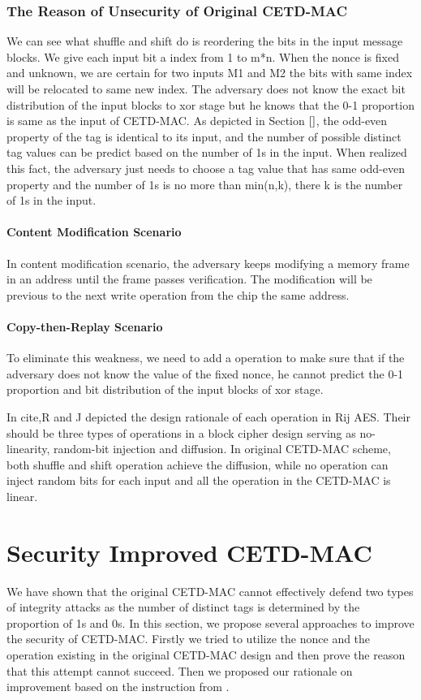 \documentclass{article}
\begin{document}
\subsubsection{The Reason of Unsecurity of Original CETD-MAC}
We can see what shuffle and shift do is reordering the bits in the input message
blocks. We give each input bit a index from 1 to m*n. When the nonce is fixed
and unknown, we are certain for two inputs M1 and M2 the bits with same index
will be relocated to same new index. The adversary does not know the exact bit
distribution of the input blocks to xor stage but he knows that the 0-1
proportion is same as the input of CETD-MAC. As depicted in Section $\ref{}$, the odd-even property of the tag is identical to its input, and the number of possible distinct tag values can be predict based on the number of 1s in the input. When realized this fact, the adversary just needs to choose a tag value that has same odd-even property and the number of 1s is no more than min(n,k), there k is the number of 1s in the input.

\paragraph{Content Modification Scenario}
In content modification scenario, the adversary keeps modifying a memory frame in an address until the frame passes verification. The modification will be previous to the next write operation from the chip the same address. 

\paragraph{Copy-then-Replay Scenario}
To eliminate this weakness, we need to add a operation to make sure that if the adversary does not know the value of the fixed nonce, he cannot predict the 0-1 proportion and bit distribution of the input blocks of xor stage. 

In cite{},R and J depicted the design rationale of each operation in Rij AES. Their should be three types of operations in a block cipher design serving as no-linearity, random-bit injection and diffusion.  
In original CETD-MAC scheme, both shuffle and shift operation achieve the diffusion, while no operation can inject random bits for each input and all the operation in the CETD-MAC is linear.  

\section{Security Improved CETD-MAC}
We have shown that the original CETD-MAC cannot effectively defend two types of integrity attacks as the number of distinct tags is determined by the proportion of 1s and 0s. In this section, we propose several approaches to improve the security of CETD-MAC. Firstly we tried to utilize the nonce and the operation existing in the original CETD-MAC design and then prove the reason that this attempt cannot succeed. Then we proposed our rationale on improvement based on the instruction from \cite{}.  
\end{document}

